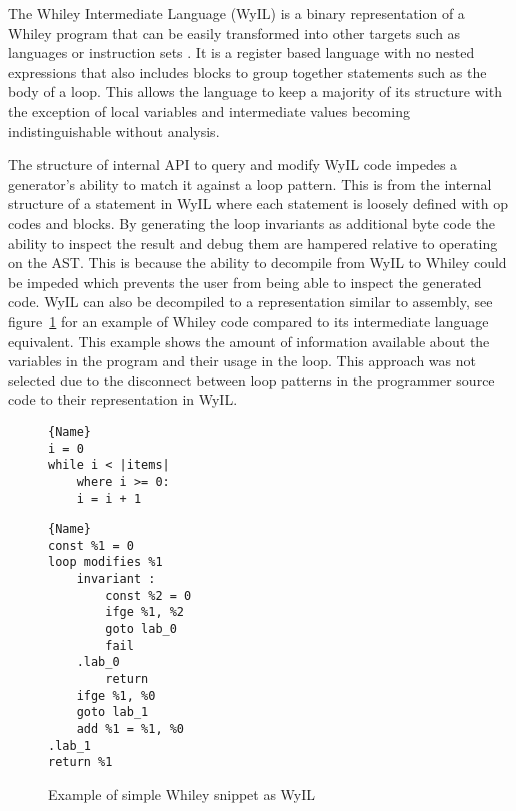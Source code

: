 The Whiley Intermediate Language (WyIL) is a binary representation of a Whiley program
that can be easily transformed into other targets such as languages or
instruction sets \cite{wyil}.
It is a register based language with no nested expressions
that also includes blocks to group together statements such as the body of a loop.
This allows the language to keep a majority of its structure with the
exception of local variables and intermediate values becoming indistinguishable
without analysis.

The structure of internal API to query and modify WyIL code impedes a
generator's ability to match it against a loop pattern.
This is from the internal structure of a statement in WyIL where each
statement is loosely defined with op codes and blocks.
By generating the loop invariants as additional byte code the ability to
inspect the result and debug them are hampered relative to operating on the
AST.  This is because the ability to decompile from WyIL to Whiley could
be impeded which prevents the user from being able to inspect the generated
code.
WyIL can also be decompiled to a representation similar to assembly, see
figure~\ref{lst:design-wyil} for an example of Whiley code compared to its
intermediate language equivalent.
This example shows the amount of information available about the variables
in the program and their usage in the loop.
This approach was not selected due to the disconnect between loop patterns
in the programmer source code to their representation in WyIL.


\begin{figure}
\noindent\begin{minipage}{.45\textwidth}
\begin{lstlisting}[caption={Whiley Code},frame=tlrb,numbers=none]{Name}
i = 0
while i < |items|
    where i >= 0:
    i = i + 1
\end{lstlisting}
\end{minipage}\hfill
\begin{minipage}{.45\textwidth}
\begin{lstlisting}[caption={WyIL Code},frame=tlrb,numbers=none]{Name}
const %1 = 0
loop modifies %1
    invariant :
        const %2 = 0
        ifge %1, %2
        goto lab_0
        fail
    .lab_0
        return
    ifge %1, %0
    goto lab_1
    add %1 = %1, %0
.lab_1
return %1
\end{lstlisting}
\end{minipage}
    \caption{Example of simple Whiley snippet as WyIL}
    \label{lst:design-wyil}
\end{figure}

